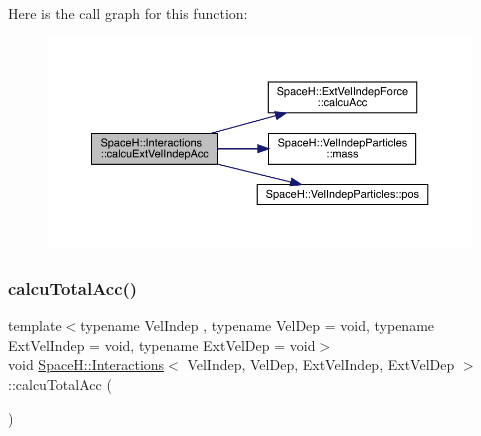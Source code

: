 Here is the call graph for this function\+:
\nopagebreak
\begin{figure}[H]
\begin{center}
\leavevmode
\includegraphics[width=350pt]{class_space_h_1_1_interactions_a56561622edc899080000b5bafce1fb79_cgraph}
\end{center}
\end{figure}
\mbox{\label{class_space_h_1_1_interactions_a03e732beb7595072c5861434cec1f24f}} 
\subsubsection{\texorpdfstring{calcu\+Total\+Acc()}{calcuTotalAcc()}}
{\footnotesize\ttfamily template$<$typename Vel\+Indep , typename Vel\+Dep  = void, typename Ext\+Vel\+Indep  = void, typename Ext\+Vel\+Dep  = void$>$ \\
void \mbox{\hyperlink{class_space_h_1_1_interactions}{Space\+H\+::\+Interactions}}$<$ Vel\+Indep, Vel\+Dep, Ext\+Vel\+Indep, Ext\+Vel\+Dep $>$\+::calcu\+Total\+Acc (\begin{DoxyParamCaption}{ }\end{DoxyParamCaption})\hspace{0.3cm}{\ttfamily [inline]}}

